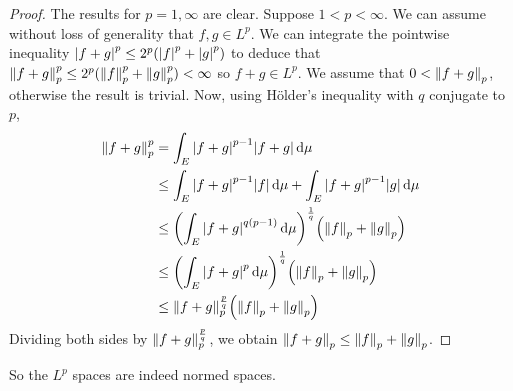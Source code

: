 \begin{proof}
	The results for \( p = 1, \infty \) are clear.
	Suppose \( 1 < p < \infty \).
	We can assume without loss of generality that \( f, g \in L^p \).
	We can integrate the pointwise inequality \( \abs{f + g}^p \leq 2^p (\abs{f}^p + \abs{g}^p) \) to deduce that \( \norm{f + g}_p^p \leq 2^p (\norm{f}_p^p + \norm{g}_p^p) < \infty \) so \( f + g \in L^p \).
	We assume that \( 0 < \norm{f+g}_p \), otherwise the result is trivial.
	Now, using H\"older's inequality with \( q \) conjugate to \( p \),
	\begin{align*}
		\norm{f + g}_p^p &= \int_E \abs{f + g}^{p-1} \abs{f + g} \dd{\mu} \\
		&\leq \int_E \abs{f + g}^{p-1} \abs{f} \dd{\mu} + \int_E \abs{f + g}^{p-1} \abs{g} \dd{\mu} \\
		&\leq \qty(\int_E \abs{f + g}^{q(p-1)} \dd{\mu})^{\frac{1}{q}} \qty(\norm{f}_p + \norm{g}_p) \\
		&\leq \qty(\int_E \abs{f + g}^p \dd{\mu})^{\frac{1}{q}} \qty(\norm{f}_p + \norm{g}_p) \\
		&\leq \norm{f+g}_p^{\frac{p}{q}} \qty(\norm{f}_p + \norm{g}_p)
	\end{align*}
	Dividing both sides by \( \norm{f+g}_p^{\frac{p}{q}} \), we obtain \( \norm{f+g}_p \leq \norm{f}_p + \norm{g}_p \).
\end{proof}
So the \( L^p \) spaces are indeed normed spaces.

